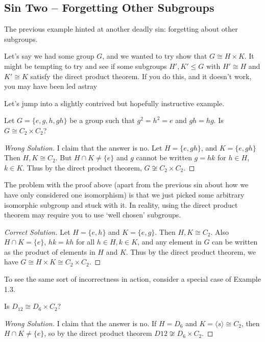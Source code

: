 \documentclass[11pt]{article}
\begin{document}
\subsection{Sin Two -- Forgetting Other Subgroups}

The previous example hinted at another deadly sin: forgetting about other subgroups.

Let's say we had some group $G$, and we wanted to try show that $G \cong H \times K$. It might be tempting to try and see if some subgroups $H', K' \leq G$ with $H' \cong H$ and $K' \cong K$ satisfy the direct product theorem. If you do this, and it doesn't work, you may have been led astray

Let's jump into a slightly contrived but hopefully instructive example.

\begin{example}[Contrived]
	Let $G = \{e, g, h, gh \}$ be a group such that $g^2 = h^2 = e$ and $gh = hg$. Is $G \cong C_2 \times C_2$?
\end{example}
\begin{proof}[{\color{Maroon}Wrong Solution}]
	I claim that the answer is {\color{Maroon} no}. Let $H = \{e, gh \}$, and $K = \{e, gh\}$ Then $H, K \cong C_2$. But $H \cap K \neq \{e\}$ and $g$ cannot be written $g = hk$ for $h \in H$, $k \in K$. Thus by the direct product theorem, $G \not \cong C_2 \times C_2$.   
\end{proof}

The problem with the proof above (apart from the previous sin about how we have only considered one isomorphism) is that we just picked some arbitrary isomorphic subgroup and stuck with it. In reality, using the direct product theorem may require you to use `well chosen' subgroups.

\begin{proof}[{\color{ForestGreen}Correct Solution}]
	Let $H = \{e, h\}$ and $K = \{e, g\}$. Then $H, K \cong C_2$. Also $H \cap K = \{e\}$, $hk = kh$ for all $h \in H, k \in K$, and any element in $G$ can be written as the product of elements in $H$ and $K$. Thus by the direct product theorem, we have $G \cong H \times K \cong C_2 \times C_2$.
\end{proof}

To see the same sort of incorrectness in action, consider a special case of Example 1.3.

\begin{example}
	Is $D_{12} \cong D_6 \times C_2$?
\end{example}
\begin{proof}[{\color{Maroon}Wrong Solution}]
	I claim that the answer is {\color{Maroon} no}. If $H = D_6$ and $K = \langle s \rangle \cong C_2$, then $H \cap K \neq \{e \}$, so by the direct product theorem $D{12} \not \cong D_6 \times C_2$.   
\end{proof}
\end{document}
